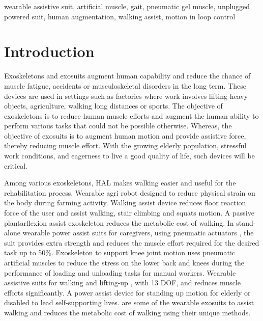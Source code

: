 \documentclass[paper,JRM,paper]{jaciiiarticle}
\begin{document}
\begin{keywords}
wearable assistive suit, artificial muscle, gait, pneumatic gel muscle, unplugged powered suit, human augmentation, walking assist, motion in loop control
\end{keywords}


\section{Introduction}

Exoskeletons and exosuits augment human capability and reduce the chance of muscle fatigue, accidents or musculoskeletal disorders in the long term. These devices are used in settings such as factories where work involves lifting heavy objects, agriculture, walking long distances or sports. The objective of exoskeletons is to reduce human muscle efforts and augment the human ability to perform various tasks that could not be possible otherwise. Whereas, the objective of exosuits is to augment human motion and provide assistive force, thereby reducing muscle effort. With the growing elderly population, stressful work conditions, and eagerness to live a good quality of life, such devices will be critical. 

Among various exoskeletons, HAL \cite{1} makes walking easier and useful for the rehabilitation process. Wearable agri robot \cite{2} designed to reduce physical strain on the body during farming activity. Walking assist device \cite{3} reduces floor reaction force of the user and assist walking, stair climbing and squats motion. A passive plantarflexion assist exoskeleton \cite{4} reduces the metabolic cost of walking. In stand-alone wearable power assist suits for caregivers, using pneumatic actuators \cite{5}, the suit provides extra strength and reduces the muscle effort required for the desired task up to 50\%. Exoskeleton to support knee joint motion \cite{6} uses pneumatic artificial muscles to reduce the stress on the lower back and knees during the performance of loading and unloading tasks for manual workers. Wearable assistive suits for walking and lifting-up \cite{7}, with 13 DOF, and reduces muscle efforts significantly. A power assist device for standing up motion \cite{8} for elderly or disabled to lead self-supporting lives. \cite{9,10,11,12} are some of the wearable exosuits to assist walking and reduces the metabolic cost of walking using their unique methods. 
\end{document}
